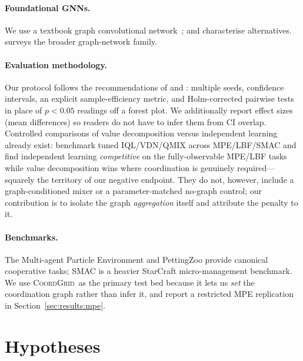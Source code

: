 \documentclass[10pt]{article}
\newcommand{\algoname}[1]{\textsc{#1}}
\newcommand{\coordgrid}{\textsc{CoordGrid}}
\begin{document}
\paragraph{Foundational GNNs.} We use a textbook graph convolutional
network~\citep{kipf_2017_gcn}; \citet{velickovic_2018_gat} and
\citet{xu_2019_gin} characterise alternatives.
\citet{battaglia_2018_gn} surveys the broader graph-network family.

\paragraph{Evaluation methodology.} Our protocol follows the recommendations
of \citet{henderson_2018_drlmatters} and \citet{agarwal_2021_precipice}:
multiple seeds, confidence intervals, an explicit sample-efficiency metric,
and Holm-corrected pairwise tests in place of $p<0.05$ readings off a
forest plot. We additionally report effect sizes (mean differences) so
readers do not have to infer them from CI overlap. Controlled comparisons of
value decomposition versus independent learning already exist:
\citet{papoudakis_2021_benchmarking} benchmark tuned IQL/VDN/QMIX across
MPE/LBF/SMAC and find independent learning \emph{competitive} on the
fully-observable MPE/LBF tasks while value decomposition wins where
coordination is genuinely required---squarely the territory of our negative
endpoint. They do not, however, include a graph-conditioned mixer or a
parameter-matched no-graph control; our contribution is to isolate the graph
\emph{aggregation} itself and attribute the penalty to it.

\paragraph{Benchmarks.} The Multi-agent Particle Environment
\citep{lowe_2017_maddpg} and PettingZoo \citep{terry_2021_pettingzoo}
provide canonical cooperative tasks; \algoname{SMAC}
\citep{samvelyan_2019_smac} is a heavier StarCraft micro-management
benchmark. We use \coordgrid\ as the primary test bed because it lets us
\emph{set} the coordination graph rather than infer it, and report a
restricted MPE replication in Section~\ref{sec:results:mpe}.

\section{Hypotheses}
\label{sec:hypotheses}
\end{document}
